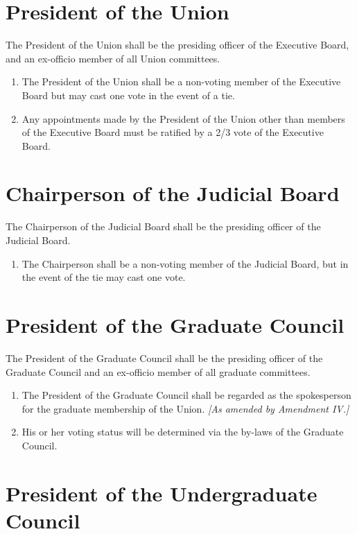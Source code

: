 \documentclass{uniondoc}
\begin{document}
\section{President of the Union}

The President of the Union shall be the presiding officer of the Executive Board, and an ex-officio member of all Union committees.

\begin{enumerate}
\item The President of the Union shall be a non-voting member of the Executive Board but may cast one vote in the event of a tie.
\item Any appointments made by the President of the Union other than members of the Executive Board must be ratified by a 2/3 vote of the Executive Board.
\end{enumerate}

\section{Chairperson of the Judicial Board}

The Chairperson of the Judicial Board shall be the presiding officer of the Judicial Board.

\begin{enumerate}
\item The Chairperson shall be a non-voting member of the Judicial Board, but in the event of the tie may cast one vote.
\end{enumerate}

\section{President of the Graduate Council}

The President of the Graduate Council shall be the presiding officer of the Graduate Council and an ex-officio member of all graduate committees.

\begin{enumerate}
\item The President of the Graduate Council shall be regarded as the spokesperson for the graduate membership of the Union. \textit{[As amended by Amendment IV.]}
\item His or her voting status will be determined via the by-laws of the Graduate Council.
\end{enumerate}

\section{President of the Undergraduate Council}
\end{document}

